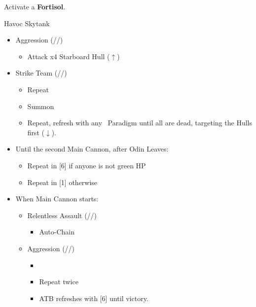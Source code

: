 	\renewcommand{\first}{[1] Aggression (\com/\com/\rav)}
	\renewcommand{\second}{[2] Relentless Assault (\rav/\com/\rav)}
	\renewcommand{\third}{[3] Aggression (\com/\com/\rav)}
	\renewcommand{\fourth}{[4] Tireless Charge (\com/\com/\med)}
	\renewcommand{\fifth}{[5] Strike Team (\com/\com/\syn)}
	\renewcommand{\sixth}{[6] Tireless Charge (\com/\com/\med)}

	Activate a \textbf{Fortisol}.

	\begin{battle}[1:43]{Havoc Skytank}
		\begin{itemize}
			\item \first
			      \begin{itemize}
				      \item Attack x4 Starboard Hull ($\uparrow$)
			      \end{itemize}
			\item \fifth
			      \begin{itemize}
				      \item Repeat
				      \item Summon
				      \item Repeat, refresh with any \com\ Paradigm until all are dead, targeting the Hulls first ($\downarrow$).
			      \end{itemize}
			\item Until the second Main Cannon, after Odin Leaves:
			      \begin{itemize}
				      \item Repeat in [6] if anyone is not green HP
				      \item Repeat in [1] otherwise
			      \end{itemize}
			\item When Main Cannon starts:
			      \begin{itemize}
				      \item \begin{flushleft} \second \end{flushleft}
				            \begin{itemize}
					            \item Auto-Chain
				            \end{itemize}
				      \item \first
				            \begin{itemize}
					            \item \stagger
					            \item Repeat twice
					            \item ATB refreshes with [6] until victory.
				            \end{itemize}
			      \end{itemize}
		\end{itemize}
	\end{battle}
